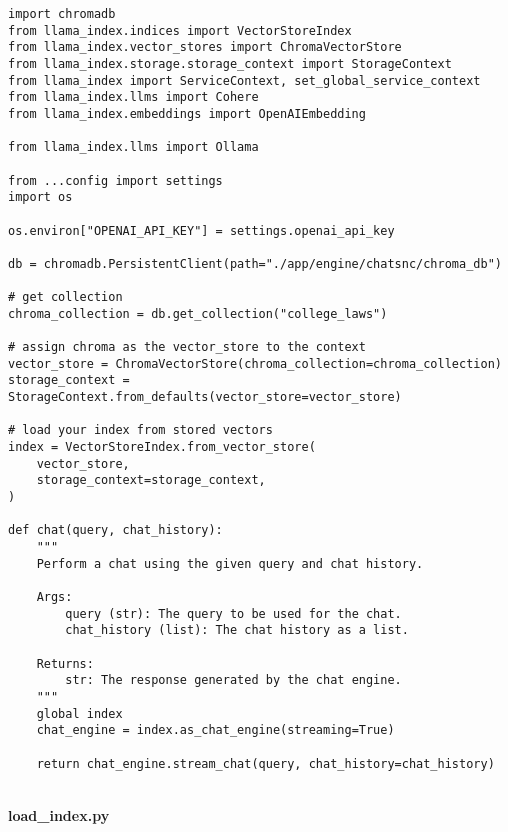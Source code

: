 \begin{Verbatim}[breaklines=true, breakanywhere=true]
import chromadb
from llama_index.indices import VectorStoreIndex
from llama_index.vector_stores import ChromaVectorStore
from llama_index.storage.storage_context import StorageContext
from llama_index import ServiceContext, set_global_service_context
from llama_index.llms import Cohere
from llama_index.embeddings import OpenAIEmbedding

from llama_index.llms import Ollama

from ...config import settings
import os

os.environ["OPENAI_API_KEY"] = settings.openai_api_key

db = chromadb.PersistentClient(path="./app/engine/chatsnc/chroma_db")

# get collection
chroma_collection = db.get_collection("college_laws")

# assign chroma as the vector_store to the context
vector_store = ChromaVectorStore(chroma_collection=chroma_collection)
storage_context = StorageContext.from_defaults(vector_store=vector_store)

# load your index from stored vectors
index = VectorStoreIndex.from_vector_store(
    vector_store,
    storage_context=storage_context,
)

def chat(query, chat_history):
    """
    Perform a chat using the given query and chat history.

    Args:
        query (str): The query to be used for the chat.
        chat_history (list): The chat history as a list.

    Returns:
        str: The response generated by the chat engine.
    """
    global index
    chat_engine = index.as_chat_engine(streaming=True)

    return chat_engine.stream_chat(query, chat_history=chat_history)  
\end{Verbatim}
\
\\
\textbf{load\_index.py}

